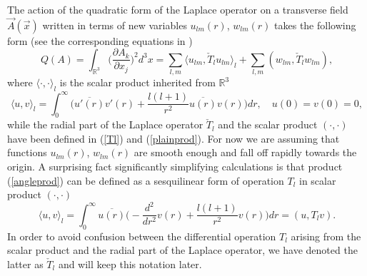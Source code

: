 \documentclass[12pt]{article}
\newcommand{\ol}{\overline}
\newcommand{\RR}{\mathbb{R}}
\begin{document}
	The action of the quadratic form of the Laplace operator on a transverse field
$ \vec{A}(\vec{x}) $
	written in terms of new variables
$ u_{lm}(r) $,
$ w_{lm}(r) $
	takes the following form (see the corresponding equations in
\cite{Lapl})
\begin{equation*}
        Q(A) = \int_{\RR^{3}}
        \bigl(\frac{\partial A_{k}}{\partial x_{j}}\bigr)^{2} d^{3} x 
	= \sum_{l,m}\langle u_{lm},\check{T}_{l}u_{lm}\rangle_{l}
	    + \sum_{l,m}(w_{lm},\check{T}_{l}w_{lm}) ,
\end{equation*}
	where
$ \langle \cdot , \cdot \rangle_{l} $
	is the scalar product inherited from 
$ \RR^{3} $
\begin{equation}
\label{angleprod}
    \langle u, v\rangle_{l} = \int_{0}^{\infty} \bigl(
	\ol{u'(r)}v'(r) + \frac{l(l+1)}{r^{2}} \ol{u(r)}v(r)\bigr) dr ,
    \quad u(0) = v(0) = 0,
\end{equation}
	while the radial part of the Laplace operator
$ \check{T}_{l} $
	and the scalar product
$ (\cdot,\cdot) $
	have been defined in
(\ref{Tl}) and
(\ref{plainprod}).
	For now we are assuming that functions
$ u_{lm}(r) $,
$ w_{lm}(r) $
	are smooth enough and fall off rapidly towards the origin.
	A surprising fact significantly simplifying calculations is that
	product
(\ref{angleprod})
	can be defined as a sesquilinear form of operation
$ T_{l} $
	in scalar product
$ (\cdot,\cdot) $
\begin{equation}
\label{Tprod}
    \langle u,v\rangle_{l} = \int_{0}^{\infty} \ol{u(r)} \bigl(
	-\frac{d^{2}}{dr^{2}}v(r) + \frac{l(l+1)}{r^{2}}v(r) \bigr) dr
	= (u, T_{l}v).
\end{equation}
	In order to avoid confusion between the differential operation
$ T_{l} $
	arising from the scalar product and the radial part of the Laplace operator,
	we have denoted the latter as
$ \check{T}_{l} $
	and will keep this notation later.
\end{document}

